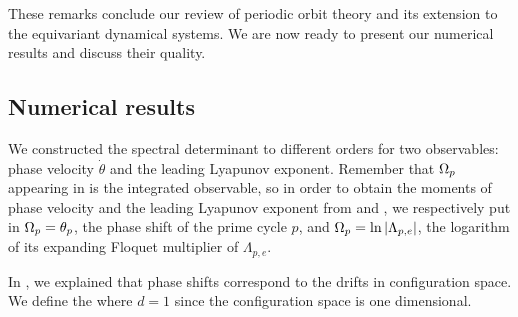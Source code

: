 These remarks conclude our review of periodic orbit theory and its
extension to the equivariant dynamical systems. We are now ready to present
our numerical results and discuss their quality.

\subsection{Numerical results}
\label{s-NumResults}

We constructed the spectral determinant  to different
orders for two observables: phase velocity $\dot{\theta}$ and the leading
Lyapunov exponent. Remember that $\Omega_p$ appearing in
 is the integrated observable, so in order to
obtain the moments of phase velocity and the leading Lyapunov exponent from
 and , we respectively put in
$\Omega_p = \theta_p$, the phase shift of the prime cycle $p$, and
$\Omega_p = \ln |\Lambda_{p,e}|$, the logarithm of its expanding Floquet
multiplier of $\Lambda_{p,e}$.

In , we explained that  phase shifts correspond
to the drifts in configuration space. We define the
where $d=1$ since the configuration space is one dimensional.

